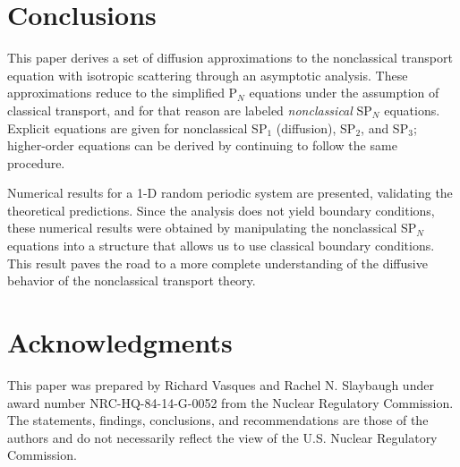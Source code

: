 \documentclass{anstrans}
\begin{document}
\section{Conclusions}
This paper derives a set of diffusion approximations to the nonclassical transport equation with isotropic scattering through an asymptotic analysis.
These approximations reduce to the simplified P$_N$ equations under the assumption of classical transport, and for that reason are labeled \textit{nonclassical} SP$_N$ equations.
Explicit equations are given for nonclassical SP$_1$ (diffusion), SP$_2$, and SP$_3$; higher-order equations can be derived by continuing to follow the same procedure.

Numerical results for a 1-D random periodic system are presented, validating the theoretical predictions.
Since the analysis does not yield boundary conditions, these numerical results were obtained by manipulating the nonclassical SP$_N$ equations into a structure that allows us to use classical boundary conditions.
This result paves the road to a more complete understanding of the diffusive behavior of the nonclassical transport theory.

\section{Acknowledgments}
This paper was prepared by Richard Vasques and Rachel N. Slaybaugh under award number NRC-HQ-84-14-G-0052 from the Nuclear Regulatory Commission.
The statements, findings, conclusions, and recommendations are those of the authors and do not necessarily reflect the view of the U.S. Nuclear Regulatory Commission.



\end{document}
